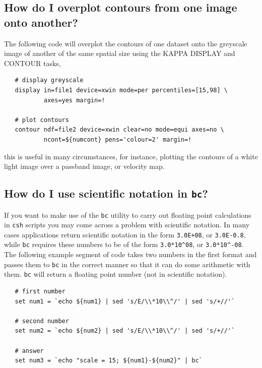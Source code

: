 \documentclass[twoside,11pt]{article}
\newcommand{\xref}[3]{#1}
\begin{document}
\subsection{How do I overplot contours from one image onto another?}

The following code will overplot the contours of one dataset onto the greyscale image of another of the same spatial size using the KAPPA \xref{DISPLAY}{sun95}{DISPLAY} and \xref{CONTOUR}{sun95}{CONTOUR} tasks,

\small\begin{verbatim}
   # display greyscale
   display in=file1 device=xwin mode=per percentiles=[15,98] \
           axes=yes margin=! 
	   
   # plot contours
   contour ndf=file2 device=xwin clear=no mode=equi axes=no \
           ncont=${numcont} pens='colour=2' margin=! 
\end{verbatim}\normalsize

this is useful in many circumstances, for instance, plotting the contours of a white light image over a passband image, or velocity map.

\subsection{How do I use scientific notation in {\tt bc}?}

If you want to make use of the {\tt bc} utility to carry out floating point calculations in {\tt csh} scripts you may come across a problem with scientific notation. In many cases applications return scientific notation in the form {\tt 3.0E+08}, or {\tt 3.0E-0.8}, while {\tt bc} requires these numbers to be of the form \verb+3.0*10^08+, or \verb+3.0*10^-08+. The following example segment of code takes two numbers in the first format and passes them to {\tt bc} in the correct manner so that it can do some arithmetic with them. {\tt bc} will return a floating point number (not in scientific notation).

\small\begin{verbatim}
   # first number
   set num1 = `echo ${num1} | sed 's/E/\\*10\\^/' | sed 's/+//'`
   
   # second number
   set num2 = `echo ${num2} | sed 's/E/\\*10\\^/' | sed 's/+//'`
   
   # answer
   set num3 = `echo "scale = 15; ${num1}-${num2}" | bc` 
\end{verbatim}\normalsize
\end{document}

